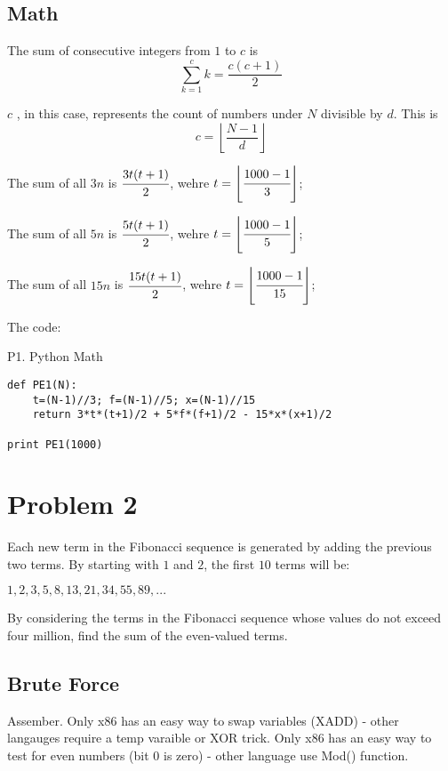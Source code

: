 \documentclass[12pt, a4page, oneside]{article}
\begin{document}
\begin{CJK*}{UTF8}{gbsn}
\subsection{Math}
\par\noindent
The sum of consecutive integers from $1$ to $c$ is $$\sum_{k=1}^c k = \frac{c(c+1)}{2}$$
\par\noindent
$c$ , in this case, represents the count of numbers under $N$ divisible by $d$. This is $$c=\left\lfloor \frac{N-1}{d} \right\rfloor$$
\par\noindent
The sum of all $3n$ is $\cfrac{3t(t+1)}{2}$, wehre $t = \left\lfloor \cfrac{1000-1}{3} \right\rfloor$;
\par\noindent
The sum of all $5n$ is $\cfrac{5t(t+1)}{2}$, wehre $t = \left\lfloor \cfrac{1000-1}{5} \right\rfloor$;
\par\noindent
The sum of all $15n$ is $\cfrac{15t(t+1)}{2}$, wehre $t = \left\lfloor \cfrac{1000-1}{15} \right\rfloor$;
\par\noindent
The code:
\begin{listing}[ht]
\caption{P1. Python Math}
\begin{verbatim}
def PE1(N):
    t=(N-1)//3; f=(N-1)//5; x=(N-1)//15
    return 3*t*(t+1)/2 + 5*f*(f+1)/2 - 15*x*(x+1)/2

print PE1(1000)
\end{verbatim}
\end{listing}

\section{Problem 2}
\par\noindent
Each new term in the Fibonacci sequence is generated by adding the previous two terms. By starting with $1$ and $2$, the first $10$ terms will be:
\par\noindent
$1, 2, 3, 5, 8, 13, 21, 34, 55, 89, ...$
\par\noindent
By considering the terms in the Fibonacci sequence whose values do not exceed four million, find the sum of the even-valued terms.
\par\noindent

\subsection{Brute Force}
\par\noindent
Assember. Only x86 has an easy way to swap variables (XADD) - other langauges require a temp varaible or XOR trick. Only x86 has an easy way to test for even numbers (bit 0 is zero) - other language use Mod() function.
\par\noindent


\end{CJK*}
\end{document}
